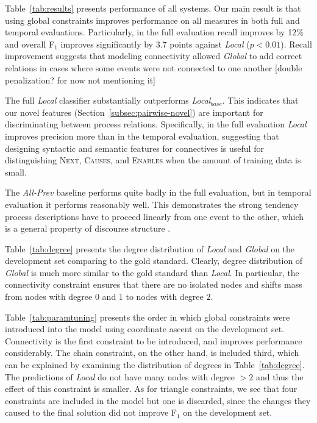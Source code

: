 Table~\ref{tab:results} presents performance of all systems. Our main result is that using global constraints improves performance on all measures in both full and temporal evaluations. Particularly, in the full evaluation recall improves by 12\% and overall F$_1$ improves significantly by 3.7 points against \emph{Local} ($p<0.01$). Recall improvement suggests that modeling connectivity allowed \emph{Global} to add correct relations in cases where some events were not connected to one another [double penalization? for now not mentioning it]

The full \emph{Local} classifier substantially outperforms \emph{Local$_{base}$}. This indicates that our novel features (Section~\ref{subsec:pairwise-novel}) are important for discriminating between process relations. Specifically, in the full evaluation \emph{Local} improves precision more than in the temporal evaluation, suggesting that designing syntactic and semantic features for connectives is useful for distinguishing \textsc{Next}, \textsc{Causes}, and \textsc{Enables} when the amount of training data is small.

The \emph{All-Prev} baseline performs quite badly in the full evaluation, but in temporal evaluation it performs reasonably well. This demonstrates the strong tendency process descriptions have to proceed linearly from one event to the other, which is a general property of discourse structure \cite{schegloff73}.

Table~\ref{tab:degree} presents the degree distribution of \emph{Local} and \emph{Global} on the development set comparing to the gold standard. Clearly, degree distribution of \emph{Global} is much more similar to the gold standard than \emph{Local}. In particular, the connectivity constraint ensures that there are no isolated nodes and shifts mass from nodes with degree $0$ and $1$ to nodes with degree $2$.

Table~\ref{tab:paramtuning} presents the order in which global constraints were introduced into the model using coordinate ascent on the development set. Connectivity is the first constraint to be introduced, and improves performance considerably. The chain constraint, on the other hand, is included third, which can be explained by examining the distribution of degrees in Table~\ref{tab:degree}. The predictions of \emph{Local} do not have many nodes with degree $>2$ and thus the effect of this constraint is smaller. As for triangle constraints, we see that four constraints are included in the model but one is discarded, since the changes they caused to the final solution did not improve F$_1$ on the development set.

